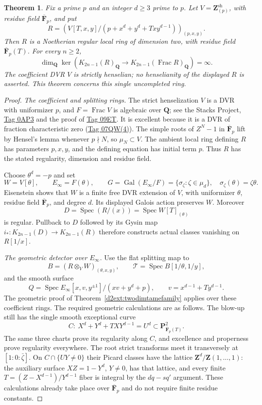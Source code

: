 \documentclass[11pt,a4paper]{amsart}
\numberwithin{equation}{section}
\newtheorem{theorem}{Theorem}[section]
\theoremstyle{definition}
\theoremstyle{remark}
\newcommand{\Q}{\mathbf Q}
\newcommand{\Z}{\mathbf Z}
\newcommand{\F}{\mathbf F}
\newcommand{\Spec}{\operatorname{Spec}}
\newcommand{\Frac}{\operatorname{Frac}}
\begin{document}
\begin{theorem}
\label{d2ext:twodimstrictcoefficientinfinite}
Fix a prime $p$ and an integer $d\ge3$ prime to $p$. Let
$V=\Z_{(p)}^{\mathrm{sh}}$, with residue field $\overline{\F}_p$,
and put
\[
 R=\left(V[T,x,y]/(p+x^d+y^d+Txy^{d-1})\right)_{(p,x,y)}.
\]
Then $R$ is a Noetherian regular local ring of dimension two,
with residue field $\overline{\F}_p(T)$. For every $n\ge2$,
\[
 \dim_{\Q}\ker\!\left(K_{2n-1}(R)_{\Q}
       \longrightarrow K_{2n-1}(\Frac R)_{\Q}\right)=\infty.
\]
The coefficient DVR $V$ is strictly henselian; no henselianity
of the displayed $R$ is asserted. This theorem concerns this
single uncompleted ring.
\end{theorem}

\begin{proof}
\emph{The coefficient and splitting rings.}
The strict henselization $V$ is a DVR with uniformizer $p$,
and $F=\Frac V$ is algebraic over $\Q$; see the Stacks Project,
\href{https://stacks.math.columbia.edu/tag/0AP3}{Tag 0AP3}
and the proof of
\href{https://stacks.math.columbia.edu/tag/09ET}{Tag 09ET}.
It is excellent because it is a DVR of fraction characteristic
zero
(\href{https://stacks.math.columbia.edu/tag/07QW}{Tag 07QW(4)}).
The simple roots of $Z^N-1$ in $\overline{\F}_p$ lift by
Hensel's lemma whenever $p\nmid N$, so $\mu_N\subset V$.
The ambient local ring defining $R$ has parameters $p,x,y$,
and the defining equation has initial term $p$. Thus $R$ has
the stated regularity, dimension and residue field.

Choose $\theta^d=-p$ and set
\[
 W=V[\theta],\qquad E_\infty=F(\theta),\qquad
 G=\operatorname{Gal}(E_\infty/F)=\{\sigma_\zeta:\zeta\in\mu_d\},
 \quad \sigma_\zeta(\theta)=\zeta\theta .
\]
Eisenstein shows that $W$ is a finite free DVR extension of
$V$, with uniformizer $\theta$, residue field $\overline{\F}_p$,
and degree $d$. Its displayed Galois action preserves $W$.
Moreover
\[
 D=\Spec(R/(x))=\Spec W[T]_{(\theta)}
\]
is regular. Pullback to $D$ followed by its Gysin map
$i_*:K_{2n-1}(D)\to K_{2n-1}(R)$ therefore constructs
actual classes vanishing on $R[1/x]$.

\emph{The geometric detector over $E_\infty$.}
Use the flat splitting map to
\[
 B=(R\otimes_VW)_{(\theta,x,y)},\qquad
 \mathcal T=\Spec B[1/\theta,1/y],
\]
and the smooth surface
\[
 Q=\Spec E_\infty[x,v,y^{\pm1}]/(xv+y^d+p),
 \qquad v=x^{d-1}+Ty^{d-1}.
\]
The geometric proof of Theorem~\ref{d2ext:twodimtamefamily}
applies over these coefficient rings. The required geometric calculations are as follows.
The blow-up still has the single smooth exceptional curve
\[
 C:\ X^d+Y^d+TXY^{d-1}=U^d
       \subset\mathbf P^2_{\overline{\F}_p(T)}.
\]
The same three charts prove its regularity along $C$, and
excellence and properness prove regularity everywhere. The
root strict transforms meet it transversely at
$[1:0:\bar\zeta]$. On $C\cap\{UY\ne0\}$ their Picard
classes have the lattice $\Z^d/\Z(1,\ldots,1)$:
the auxiliary surface
$XZ=1-Y^d$, $Y\ne0$, has that lattice, and every finite
$T=(Z-X^{d-1})/Y^{d-1}$ fiber is integral by the
$dq-sq'$ argument. These calculations already take place
over $\overline{\F}_p$ and do not require finite residue
constants.


\end{proof}
\end{document}
